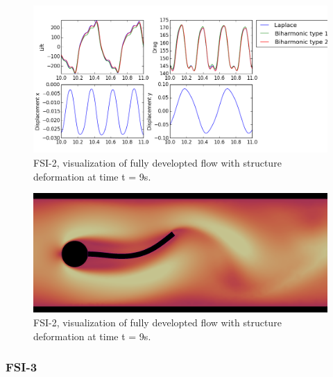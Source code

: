 \begin{figure}[h!]
  \centering
    \includegraphics[scale=0.64]{./Fig/fsi2compare.png}
      \caption{FSI-2, visualization of fully developted flow with structure deformation at time t = 9s.}
\end{figure}

\begin{figure}[h!]
  \centering
    \includegraphics[scale=0.2]{./Fig/fsi2flow.png}
      \caption{FSI-2, visualization of fully developted flow with structure deformation at time t = 9s.}
\end{figure}

\newpage
\subsubsection{FSI-3}

